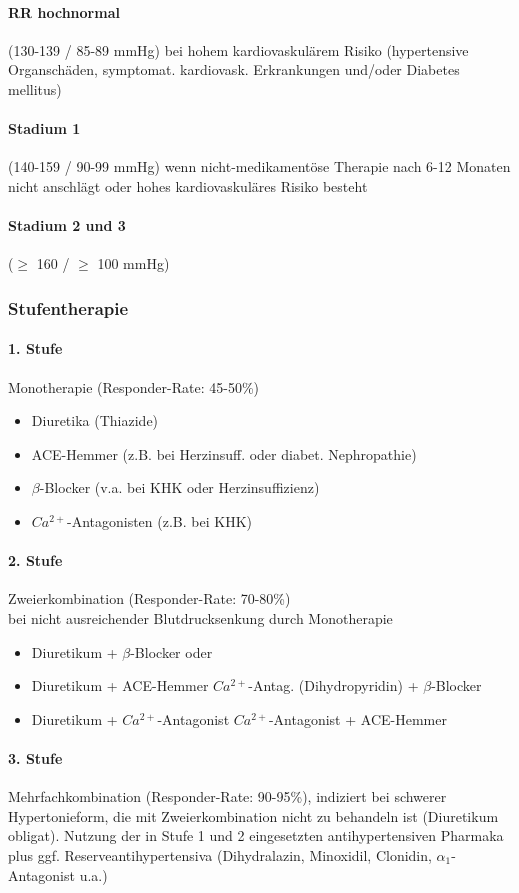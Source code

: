 \documentclass[10pt,a4paper]{report}
\begin{document}
\paragraph{RR hochnormal} (130-139 / 85-89 mmHg)
bei hohem kardiovaskulärem Risiko (hypertensive Organschäden, symptomat. kardiovask. Erkrankungen und/oder Diabetes mellitus)
\paragraph{Stadium 1} (140-159 / 90-99 mmHg)
	wenn nicht-medikamentöse Therapie nach 6-12 Monaten nicht anschlägt 	oder hohes kardiovaskuläres Risiko besteht
\paragraph{Stadium 2 und 3} ($\geq$ 160 / $\geq$ 100 mmHg)
\subsubsection{Stufentherapie}
\paragraph{1. Stufe} 	Monotherapie (Responder-Rate: 45-50\%)
\begin{itemize}
	\item Diuretika (Thiazide)
	\item ACE-Hemmer (z.B. bei Herzinsuff. oder diabet. Nephropathie)
	\item $\beta$-Blocker (v.a. bei KHK oder Herzinsuffizienz)
	\item $Ca^{2+}$-Antagonisten (z.B. bei KHK)
\end{itemize}		
\paragraph{2. Stufe} 	Zweierkombination (Responder-Rate: 70-80\%) \\
bei nicht ausreichender Blutdrucksenkung durch Monotherapie
\begin{itemize}
	\item Diuretikum + $\beta$-Blocker oder
	\item Diuretikum + ACE-Hemmer $Ca^{2+}$-Antag. (Dihydropyridin) + $\beta$-Blocker			\item Diuretikum +	$Ca^{2+}$-Antagonist	$Ca^{2+}$-Antagonist + ACE-Hemmer
\end{itemize}		
\paragraph{3. Stufe} Mehrfachkombination (Responder-Rate: 90-95\%), indiziert bei schwerer Hypertonieform, die mit Zweierkombination nicht zu behandeln ist (Diuretikum obligat). Nutzung der in Stufe 1 und 2 eingesetzten antihypertensiven Pharmaka  plus ggf. Reserveantihypertensiva (Dihydralazin, Minoxidil, Clonidin, $\alpha_1$-Antagonist u.a.)
\end{document}

